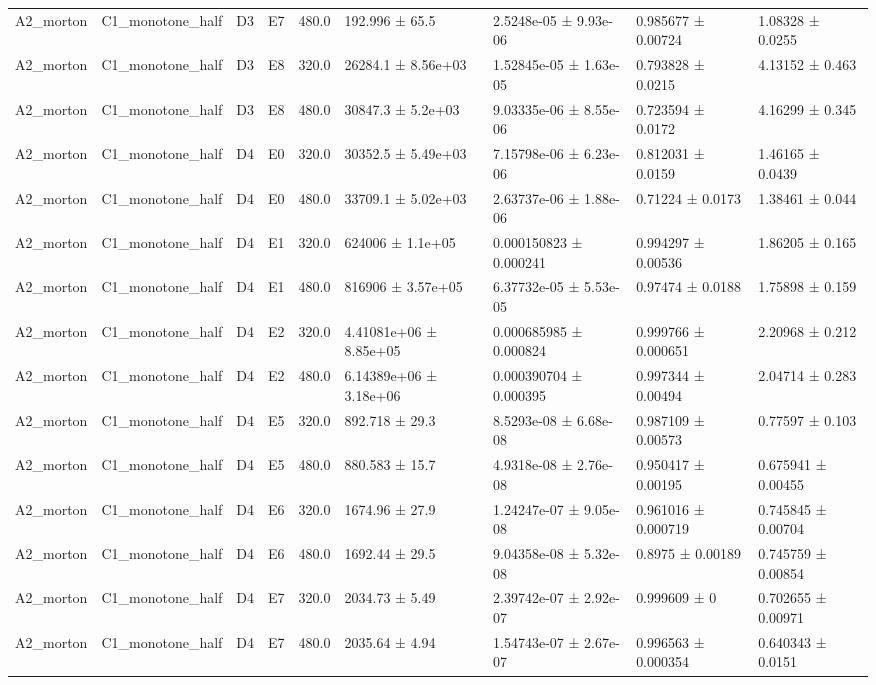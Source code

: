 \begin{table}
\begin{tabular}{lllllllll}
A2\_morton & C1\_monotone\_half & D3 & E7 & 480.0 & 192.996 ± 65.5 & 2.5248e-05 ± 9.93e-06 & 0.985677 ± 0.00724 & 1.08328 ± 0.0255 \\
A2\_morton & C1\_monotone\_half & D3 & E8 & 320.0 & 26284.1 ± 8.56e+03 & 1.52845e-05 ± 1.63e-05 & 0.793828 ± 0.0215 & 4.13152 ± 0.463 \\
A2\_morton & C1\_monotone\_half & D3 & E8 & 480.0 & 30847.3 ± 5.2e+03 & 9.03335e-06 ± 8.55e-06 & 0.723594 ± 0.0172 & 4.16299 ± 0.345 \\
A2\_morton & C1\_monotone\_half & D4 & E0 & 320.0 & 30352.5 ± 5.49e+03 & 7.15798e-06 ± 6.23e-06 & 0.812031 ± 0.0159 & 1.46165 ± 0.0439 \\
A2\_morton & C1\_monotone\_half & D4 & E0 & 480.0 & 33709.1 ± 5.02e+03 & 2.63737e-06 ± 1.88e-06 & 0.71224 ± 0.0173 & 1.38461 ± 0.044 \\
A2\_morton & C1\_monotone\_half & D4 & E1 & 320.0 & 624006 ± 1.1e+05 & 0.000150823 ± 0.000241 & 0.994297 ± 0.00536 & 1.86205 ± 0.165 \\
A2\_morton & C1\_monotone\_half & D4 & E1 & 480.0 & 816906 ± 3.57e+05 & 6.37732e-05 ± 5.53e-05 & 0.97474 ± 0.0188 & 1.75898 ± 0.159 \\
A2\_morton & C1\_monotone\_half & D4 & E2 & 320.0 & 4.41081e+06 ± 8.85e+05 & 0.000685985 ± 0.000824 & 0.999766 ± 0.000651 & 2.20968 ± 0.212 \\
A2\_morton & C1\_monotone\_half & D4 & E2 & 480.0 & 6.14389e+06 ± 3.18e+06 & 0.000390704 ± 0.000395 & 0.997344 ± 0.00494 & 2.04714 ± 0.283 \\
A2\_morton & C1\_monotone\_half & D4 & E5 & 320.0 & 892.718 ± 29.3 & 8.5293e-08 ± 6.68e-08 & 0.987109 ± 0.00573 & 0.77597 ± 0.103 \\
A2\_morton & C1\_monotone\_half & D4 & E5 & 480.0 & 880.583 ± 15.7 & 4.9318e-08 ± 2.76e-08 & 0.950417 ± 0.00195 & 0.675941 ± 0.00455 \\
A2\_morton & C1\_monotone\_half & D4 & E6 & 320.0 & 1674.96 ± 27.9 & 1.24247e-07 ± 9.05e-08 & 0.961016 ± 0.000719 & 0.745845 ± 0.00704 \\
A2\_morton & C1\_monotone\_half & D4 & E6 & 480.0 & 1692.44 ± 29.5 & 9.04358e-08 ± 5.32e-08 & 0.8975 ± 0.00189 & 0.745759 ± 0.00854 \\
A2\_morton & C1\_monotone\_half & D4 & E7 & 320.0 & 2034.73 ± 5.49 & 2.39742e-07 ± 2.92e-07 & 0.999609 ± 0 & 0.702655 ± 0.00971 \\
A2\_morton & C1\_monotone\_half & D4 & E7 & 480.0 & 2035.64 ± 4.94 & 1.54743e-07 ± 2.67e-07 & 0.996563 ± 0.000354 & 0.640343 ± 0.0151 \\

\end{tabular}
\end{table}
